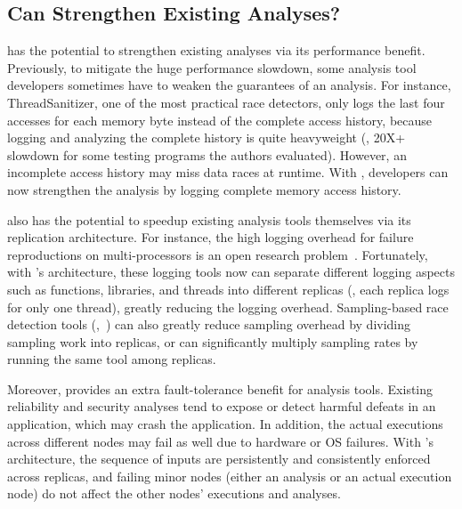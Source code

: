 \subsection{Can \xxx Strengthen Existing Analyses?} 
\label{sec:strengthen-analysis}

\xxx has the potential to strengthen existing analyses via its performance 
benefit. Previously, to mitigate the huge performance slowdown, some analysis 
tool developers sometimes have to weaken the guarantees of an analysis. For 
instance, ThreadSanitizer\cite{tsan}, one of the most practical race detectors, 
only logs the last four accesses for each memory byte instead of the complete 
access history, because logging and analyzing the complete history is quite 
heavyweight (\eg, 20X+ slowdown for some testing programs the authors 
evaluated). However, an incomplete access history may miss data races at 
runtime. With \xxx, developers can now strengthen the analysis by logging 
complete memory access history.

\xxx also has the potential to speedup existing analysis tools themselves via 
its replication architecture. For instance, the high logging overhead for 
failure reproductions on multi-processors is an open research 
problem~\cite{sherlog:asplos10}. Fortunately, with \xxx's architecture, these 
logging tools now can separate different logging aspects such as functions, 
libraries, and threads into different replicas (\eg, each replica logs for only 
one thread), greatly reducing the logging overhead. Sampling-based race 
detection tools (\eg,~\cite{datacollider:osdi10}) can also greatly reduce 
sampling overhead by dividing sampling work into replicas, or can significantly 
multiply sampling rates by running the same tool among replicas.

Moreover, \xxx provides an extra fault-tolerance benefit for analysis tools. 
Existing reliability and security analyses tend to expose or detect harmful 
defeats in an application, which may crash the application. In addition, the 
actual executions across different nodes may fail as well due to hardware or OS 
failures. With \xxx's \smr architecture, the sequence of inputs are 
persistently and consistently enforced across replicas, and failing minor 
nodes (either an analysis or an actual execution node) do not affect the other 
nodes' executions and analyses.

% 

